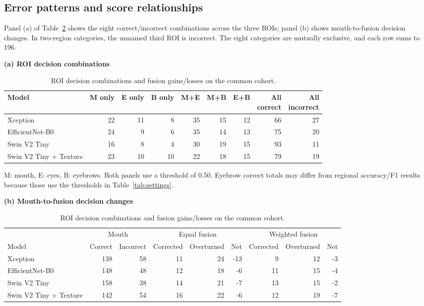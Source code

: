 \documentclass[a4paper]{elektr}
\begin{document}
\subsection{Error patterns and score relationships}
Panel (a) of Table~\ref{tab:errors} shows the eight correct/incorrect combinations across the three ROIs; panel (b) shows mouth-to-fusion decision changes. In two-region categories, the unnamed third ROI is incorrect. The eight categories are mutually exclusive, and each row sums to 196.
\begin{table}[!htbp]\centering\begin{minipage}{15.8cm}
\caption{ROI decision combinations and fusion gains/losses on the common cohort.}\label{tab:errors}
\centering \small
\textbf{(a) ROI decision combinations}\par\smallskip
\begin{tabular*}{\linewidth}{@{\extracolsep{\fill}}lrrrrrrrr@{}}\toprule
Model & M only & E only & B only & M+E & M+B & E+B & \shortstack{All\\correct} & \shortstack{All\\incorrect} \\\midrule
Xception & 22 & 11 & 8 & 35 & 15 & 12 & 66 & 27 \\
EfficientNet-B0 & 24 & 9 & 6 & 35 & 14 & 13 & 75 & 20 \\
Swin V2 Tiny & 16 & 8 & 4 & 30 & 19 & 15 & 93 & 11 \\
Swin V2 Tiny + Texture & 23 & 10 & 10 & 22 & 18 & 15 & 79 & 19 \\
\bottomrule\end{tabular*}
\par\smallskip\begin{minipage}{\linewidth}\small M: mouth, E: eyes, B: eyebrows. Both panels use a threshold of 0.50. Eyebrow correct totals may differ from regional accuracy/F1 results because those use the thresholds in Table~\ref{tab:settings}.\end{minipage}
\par\medskip\small\textbf{(b) Mouth-to-fusion decision changes}\par\smallskip
\begin{tabular*}{\linewidth}{@{\extracolsep{\fill}}lrrrrrrrr@{}}\toprule
 & \multicolumn{2}{c}{Mouth} & \multicolumn{3}{c}{Equal fusion} & \multicolumn{3}{c}{Weighted fusion}\\
Model & Correct & Incorrect & Corrected & Overturned & Net & Corrected & Overturned & Net\\\midrule
Xception & 138 & 58 & 11 & 24 & -13 & 9 & 12 & -3 \\
EfficientNet-B0 & 148 & 48 & 12 & 18 & -6 & 11 & 15 & -4 \\
Swin V2 Tiny & 158 & 38 & 14 & 21 & -7 & 13 & 15 & -2 \\
Swin V2 Tiny + Texture & 142 & 54 & 16 & 22 & -6 & 12 & 19 & -7 \\\bottomrule\end{tabular*}\end{minipage}\end{table}
\end{document}
